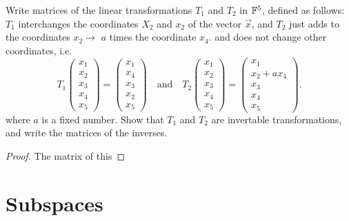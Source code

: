 \begin{exercise}
  Write matrices of the linear transformations $T_1$ and $T_2$ in $\F^5$,
  defined as follows: $T_1$ interchanges the coordinates $X_2$ and $x_2$
  of the vector $\vec{x}$, and $T_2$ just adds to the coordinates 
  $x_2\to$
  $a$ times the coordinate $x_4$. and does not change other coordinates, i.e.
  \[
    T_1
    \begin{pmatrix}
      x_1\\x_2\\x_3\\x_4\\x_5
    \end{pmatrix}=
    \begin{pmatrix}
      x_1\\x_4\\x_3\\x_2\\x_5
    \end{pmatrix}
    \quad\text{and}\quad
    T_2
    \begin{pmatrix}
      x_1\\x_2\\x_3\\x_4\\x_5
    \end{pmatrix}=
    \begin{pmatrix}
      x_1\\x_2+ax_4\\x_3\\x_4\\x_5
    \end{pmatrix}.
  \]
  where $a$ is a fixed number.
  Show that $T_1$ and $T_2$ are invertable transformations, and write
  the matrices of the inverses.
\end{exercise}
\begin{proof}
  The matrix of this 
\end{proof}



\section{Subspaces}


